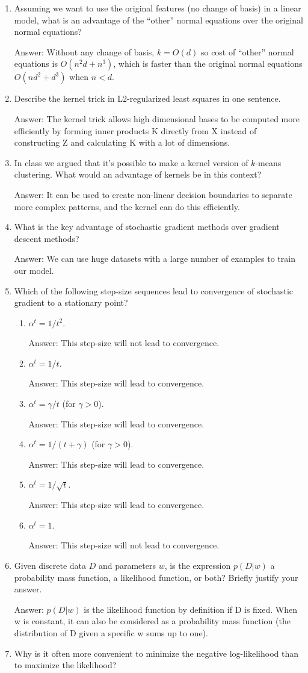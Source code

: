 \documentclass{article}
\def\ans#1{\par\gre{Answer: #1}}
\def\gre#1{{\color{gre}#1}}
\def\enum#1{\begin{enumerate}#1\end{enumerate}}
\begin{document}
\enum{
\item Assuming we want to use the original features (no change of basis) in a linear model, what is an advantage of the ``other'' normal equations over the original normal equations?
\ans{Without any change of basis, $k=O(d)$ so cost of ``other'' normal equations is $O(n^2d+n^3)$, which is faster than the original normal equations $O(nd^2+d^3)$ when $n < d$.}
\item Describe the kernel trick in L2-regularized least squares in one sentence.
\ans{The kernel trick allows high dimensional bases to be computed more efficiently by forming inner products K directly from X instead of constructing Z and calculating K with a lot of dimensions.}
\item In class we argued that it's possible to make a kernel version of $k$-means clustering. What would an advantage of kernels be in this context?
\ans{It can be used to create non-linear decision boundaries to separate more complex patterns, and the kernel can do this efficiently.}
\item What is the key advantage of stochastic gradient methods over gradient descent methods?
\ans{We can use huge datasets with a large number of examples to train our model.}
\item Which of the following step-size sequences lead to convergence of stochastic gradient to a stationary point?
\enum{
\item $\alpha^t = 1/t^2$.
\ans{This step-size will not lead to convergence.}
\item $\alpha^t = 1/t$.
\ans{This step-size will lead to convergence.}
\item $\alpha^t = \gamma/t$ (for $\gamma > 0$).
\ans{This step-size will lead to convergence.}
\item $\alpha^t = 1/(t+\gamma)$ (for $\gamma > 0$).
\ans{This step-size will lead to convergence.}
\item $\alpha^t = 1/\sqrt{t}$.
\ans{This step-size will lead to convergence.}
\item $\alpha^t = 1$.
\ans{This step-size will not lead to convergence.}
}
\item{Given discrete data $D$ and parameters $w$, is the expression $p(D|w)$ a probability mass function, a likelihood function, or both? Briefly justify your answer.}
\ans{$p(D|w)$ is the likelihood function by definition if D is fixed. When w is constant, it can also be considered as a probability mass function (the distribution of D given a specific w sums up to one).}
\item{Why is it often more convenient to minimize the negative log-likelihood than to maximize the likelihood?}
}
\end{document}
